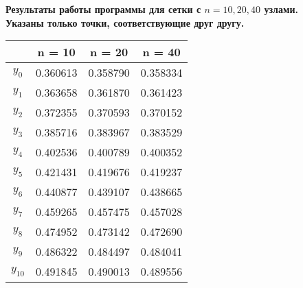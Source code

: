 \documentclass[a4paper,12pt]{report}
\begin{document}
\begin{center}
{\bf Результаты работы программы для сетки с $n = 10, 20, 40$ узлами. \\ Указаны только точки, соответствующие друг другу.} \\
\bigskip
\begin{tabular}{|c|c|c|c|}
\hline
& n = 10 & n = 20 & n = 40 \\ \hline
$y_0$ & 0.360613 & 0.358790 & 0.358334 \\ \hline
$y_1$ & 0.363658 & 0.361870 & 0.361423 \\ \hline
$y_2$ & 0.372355 & 0.370593 & 0.370152 \\ \hline
$y_3$ & 0.385716 & 0.383967 & 0.383529 \\ \hline
$y_4$ & 0.402536 & 0.400789 & 0.400352 \\ \hline
$y_5$ & 0.421431 & 0.419676 & 0.419237 \\ \hline
$y_6$ & 0.440877 & 0.439107 & 0.438665 \\ \hline
$y_7$ & 0.459265 & 0.457475 & 0.457028 \\ \hline
$y_8$ & 0.474952 & 0.473142 & 0.472690 \\ \hline
$y_9$ & 0.486322 & 0.484497 & 0.484041 \\ \hline
$y_{10}$ & 0.491845 & 0.490013 & 0.489556 \\ \hline
\end{tabular}
\end{center}
\end{document}
